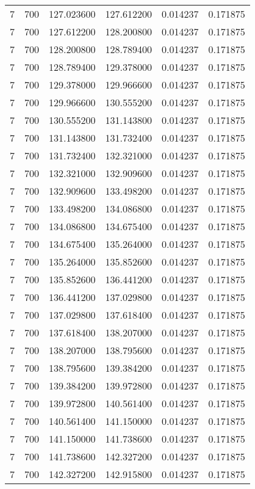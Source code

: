 \begin{longtable}{rrrrrr}
7 & 700 & 127.023600 & 127.612200 & 0.014237 & 0.171875 \\
7 & 700 & 127.612200 & 128.200800 & 0.014237 & 0.171875 \\
7 & 700 & 128.200800 & 128.789400 & 0.014237 & 0.171875 \\
7 & 700 & 128.789400 & 129.378000 & 0.014237 & 0.171875 \\
7 & 700 & 129.378000 & 129.966600 & 0.014237 & 0.171875 \\
7 & 700 & 129.966600 & 130.555200 & 0.014237 & 0.171875 \\
7 & 700 & 130.555200 & 131.143800 & 0.014237 & 0.171875 \\
7 & 700 & 131.143800 & 131.732400 & 0.014237 & 0.171875 \\
7 & 700 & 131.732400 & 132.321000 & 0.014237 & 0.171875 \\
7 & 700 & 132.321000 & 132.909600 & 0.014237 & 0.171875 \\
7 & 700 & 132.909600 & 133.498200 & 0.014237 & 0.171875 \\
7 & 700 & 133.498200 & 134.086800 & 0.014237 & 0.171875 \\
7 & 700 & 134.086800 & 134.675400 & 0.014237 & 0.171875 \\
7 & 700 & 134.675400 & 135.264000 & 0.014237 & 0.171875 \\
7 & 700 & 135.264000 & 135.852600 & 0.014237 & 0.171875 \\
7 & 700 & 135.852600 & 136.441200 & 0.014237 & 0.171875 \\
7 & 700 & 136.441200 & 137.029800 & 0.014237 & 0.171875 \\
7 & 700 & 137.029800 & 137.618400 & 0.014237 & 0.171875 \\
7 & 700 & 137.618400 & 138.207000 & 0.014237 & 0.171875 \\
7 & 700 & 138.207000 & 138.795600 & 0.014237 & 0.171875 \\
7 & 700 & 138.795600 & 139.384200 & 0.014237 & 0.171875 \\
7 & 700 & 139.384200 & 139.972800 & 0.014237 & 0.171875 \\
7 & 700 & 139.972800 & 140.561400 & 0.014237 & 0.171875 \\
7 & 700 & 140.561400 & 141.150000 & 0.014237 & 0.171875 \\
7 & 700 & 141.150000 & 141.738600 & 0.014237 & 0.171875 \\
7 & 700 & 141.738600 & 142.327200 & 0.014237 & 0.171875 \\
7 & 700 & 142.327200 & 142.915800 & 0.014237 & 0.171875 \\

\end{longtable}
